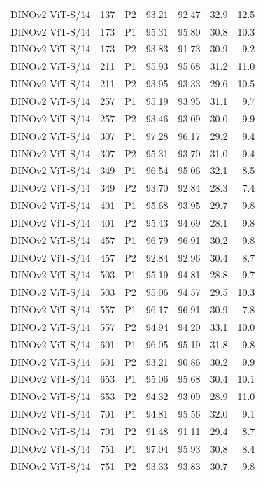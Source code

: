 {\begin{longtable}{lrlrrrr}
DINOv2 ViT-S/14 & 137 & P2 & 93.21 & 92.47 & 32.9 & 12.5 \\
DINOv2 ViT-S/14 & 173 & P1 & 95.31 & 95.80 & 30.8 & 10.3 \\
DINOv2 ViT-S/14 & 173 & P2 & 93.83 & 91.73 & 30.9 & 9.2 \\
DINOv2 ViT-S/14 & 211 & P1 & 95.93 & 95.68 & 31.2 & 11.0 \\
DINOv2 ViT-S/14 & 211 & P2 & 93.95 & 93.33 & 29.6 & 10.5 \\
DINOv2 ViT-S/14 & 257 & P1 & 95.19 & 93.95 & 31.1 & 9.7 \\
DINOv2 ViT-S/14 & 257 & P2 & 93.46 & 93.09 & 30.0 & 9.9 \\
DINOv2 ViT-S/14 & 307 & P1 & 97.28 & 96.17 & 29.2 & 9.4 \\
DINOv2 ViT-S/14 & 307 & P2 & 95.31 & 93.70 & 31.0 & 9.4 \\
DINOv2 ViT-S/14 & 349 & P1 & 96.54 & 95.06 & 32.1 & 8.5 \\
DINOv2 ViT-S/14 & 349 & P2 & 93.70 & 92.84 & 28.3 & 7.4 \\
DINOv2 ViT-S/14 & 401 & P1 & 95.68 & 93.95 & 29.7 & 9.8 \\
DINOv2 ViT-S/14 & 401 & P2 & 95.43 & 94.69 & 28.1 & 9.8 \\
DINOv2 ViT-S/14 & 457 & P1 & 96.79 & 96.91 & 30.2 & 9.8 \\
DINOv2 ViT-S/14 & 457 & P2 & 92.84 & 92.96 & 30.4 & 8.7 \\
DINOv2 ViT-S/14 & 503 & P1 & 95.19 & 94.81 & 28.8 & 9.7 \\
DINOv2 ViT-S/14 & 503 & P2 & 95.06 & 94.57 & 29.5 & 10.3 \\
DINOv2 ViT-S/14 & 557 & P1 & 96.17 & 96.91 & 30.9 & 7.8 \\
DINOv2 ViT-S/14 & 557 & P2 & 94.94 & 94.20 & 33.1 & 10.0 \\
DINOv2 ViT-S/14 & 601 & P1 & 96.05 & 95.19 & 31.8 & 9.8 \\
DINOv2 ViT-S/14 & 601 & P2 & 93.21 & 90.86 & 30.2 & 9.9 \\
DINOv2 ViT-S/14 & 653 & P1 & 95.06 & 95.68 & 30.4 & 10.1 \\
DINOv2 ViT-S/14 & 653 & P2 & 94.32 & 93.09 & 28.9 & 11.0 \\
DINOv2 ViT-S/14 & 701 & P1 & 94.81 & 95.56 & 32.0 & 9.1 \\
DINOv2 ViT-S/14 & 701 & P2 & 91.48 & 91.11 & 29.4 & 8.7 \\
DINOv2 ViT-S/14 & 751 & P1 & 97.04 & 95.93 & 30.8 & 8.4 \\
DINOv2 ViT-S/14 & 751 & P2 & 93.33 & 93.83 & 30.7 & 9.8 \\

\end{longtable}}
